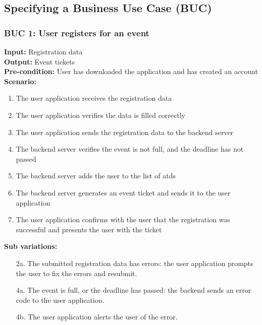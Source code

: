 \documentclass[12pt]{article}
\begin{document}
\subsection{Specifying a Business Use Case (BUC)}

\subsubsection*{BUC 1: User registers for an event}
\textbf{Input:} Registration data \\
\textbf{Output:} Event tickets \\
\textbf{Pre-condition:} User has downloaded the application and has created an account \\
\textbf{Scenario:}
\begin{enumerate}
  \item The user application receives the registration data
  \item The user application verifies the data is filled correctly
  \item The user application sends the registration data to the backend server
  \item The backend server verifies the event is not full, and the deadline has not passed
  \item The backend server adds the user to the list of \glspl{atd}
  \item The backend server generates an event ticket and sends it to the user application
  \item The user application confirms with the user that the registration was successful and presents the user with the
    ticket
\end{enumerate}
\textbf{Sub variations:}
\begin{itemize}
  \item [2a.] The submitted registration data has errors: the user application prompts the user to fix the errors and resubmit.
  \item [4a.] The event is full, or the deadline has passed: the backend sends an error code to the user application.
  \item [4b.] The user application alerts the user of the error.
\end{itemize}
\end{document}
